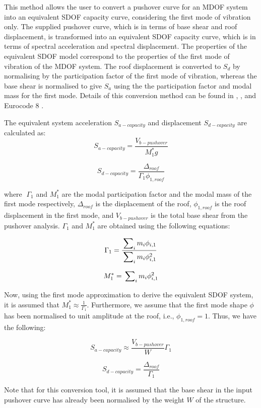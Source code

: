 This method allows the user to convert a pushover curve for an MDOF system into an equivalent SDOF capacity curve, considering the first mode of vibration only. The supplied pushover curve, which is in terms of base shear and roof displacement, is transformed into an equivalent SDOF capacity curve, which is in terms of spectral acceleration and spectral displacement. The properties of the equivalent SDOF model correspond to the properties of the first mode of vibration of the MDOF system. The roof displacement is converted to $S_d$ by normalising by the participation factor of the first mode of vibration, whereas the base shear is normalised to give $S_a$ using the the participation factor and modal mass for the first mode. Details of this conversion method can be found in \citet{ATC1996}, \citet{FEMA4402005}, and Eurocode 8 \citep{CEN2005}.

The equivalent system acceleration $S_{a-capacity}$ and displacement $S_{d-capacity}$ are calculated as:
\begin{equation}
	S_{a-capacity} = \frac{V_{b-pushover}}{M_{1}^{*} g}
\end{equation}

\begin{equation}
	S_{d-capacity} = \frac{\Delta_{roof}}{\Gamma_{1} \phi_{1, roof}}
\end{equation}

where 􏰁$\Gamma_{1}$ and $M_{1}^{*}$ are the modal participation factor and the modal mass of the first mode respectively, $\Delta_{roof}$ is the displacement of the roof, $\phi_{1, roof}$ is the roof displacement in the first mode, and $V_{b-pushover}$ is the total base shear from the pushover analysis. $\Gamma_{1}$ and $M_{1}^{*}$ are obtained using the following equations:

\begin{equation}
	\Gamma_{1} = \frac{\sideset{}{_i}\sum m_i \phi_{i,1}}{\sideset{}{_i}\sum m_i \phi_{i,1}^2}
\end{equation}

\begin{equation}
	M_{1}^{*} = \sideset{}{_i}\sum m_i \phi_{i,1}^2
\end{equation}

Now, using the first mode approximation to derive the equivalent SDOF system, it is assumed that $M_{1}^{*} \approx \frac{1}{\Gamma_{1}}$. Furthermore, we assume that the first mode shape $\phi$ has been normalised to unit amplitude at the roof, i.e., $\phi_{1, roof} = 1$. Thus, we have the following:

\begin{equation}
	S_{a-capacity} \approx \frac{V_{b-pushover}}{W} \Gamma_1
\end{equation}

\begin{equation}
	S_{d-capacity} = \frac{\Delta_{roof}}{\Gamma_1}
\end{equation}

Note that for this conversion tool, it is assumed that the base shear in the input pushover curve has already been normalised by the weight $W$ of the structure.